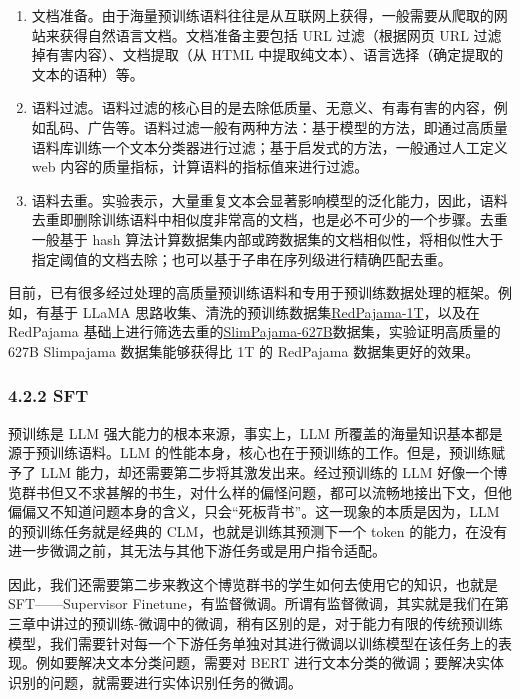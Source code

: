 \documentclass[12pt,a4paper]{book}
\begin{document}
\begin{enumerate}
\def\labelenumi{\arabic{enumi}.}
\tightlist
\item
  文档准备。由于海量预训练语料往往是从互联网上获得，一般需要从爬取的网站来获得自然语言文档。文档准备主要包括
  URL 过滤（根据网页 URL 过滤掉有害内容）、文档提取（从 HTML
  中提取纯文本）、语言选择（确定提取的文本的语种）等。
\item
  语料过滤。语料过滤的核心目的是去除低质量、无意义、有毒有害的内容，例如乱码、广告等。语料过滤一般有两种方法：基于模型的方法，即通过高质量语料库训练一个文本分类器进行过滤；基于启发式的方法，一般通过人工定义
  web 内容的质量指标，计算语料的指标值来进行过滤。
\item
  语料去重。实验表示，大量重复文本会显著影响模型的泛化能力，因此，语料去重即删除训练语料中相似度非常高的文档，也是必不可少的一个步骤。去重一般基于
  hash
  算法计算数据集内部或跨数据集的文档相似性，将相似性大于指定阈值的文档去除；也可以基于子串在序列级进行精确匹配去重。
\end{enumerate}

目前，已有很多经过处理的高质量预训练语料和专用于预训练数据处理的框架。例如，有基于
LLaMA
思路收集、清洗的预训练数据集\href{https://huggingface.co/datasets/togethercomputer/RedPajama-Data-1T}{RedPajama-1T}，以及在
RedPajama
基础上进行筛选去重的\href{https://huggingface.co/datasets/cerebras/SlimPajama-627B/tree/main/train}{SlimPajama-627B}数据集，实验证明高质量的
627B Slimpajama 数据集能够获得比 1T 的 RedPajama 数据集更好的效果。

\subsubsection{4.2.2 SFT}\label{sft}

预训练是 LLM 强大能力的根本来源，事实上，LLM
所覆盖的海量知识基本都是源于预训练语料。LLM
的性能本身，核心也在于预训练的工作。但是，预训练赋予了 LLM
能力，却还需要第二步将其激发出来。经过预训练的 LLM
好像一个博览群书但又不求甚解的书生，对什么样的偏怪问题，都可以流畅地接出下文，但他偏偏又不知道问题本身的含义，只会``死板背书''。这一现象的本质是因为，LLM
的预训练任务就是经典的 CLM，也就是训练其预测下一个 token
的能力，在没有进一步微调之前，其无法与其他下游任务或是用户指令适配。

因此，我们还需要第二步来教这个博览群书的学生如何去使用它的知识，也就是
SFT------Supervisor
Finetune，有监督微调。所谓有监督微调，其实就是我们在第三章中讲过的预训练-微调中的微调，稍有区别的是，对于能力有限的传统预训练模型，我们需要针对每一个下游任务单独对其进行微调以训练模型在该任务上的表现。例如要解决文本分类问题，需要对
BERT
进行文本分类的微调；要解决实体识别的问题，就需要进行实体识别任务的微调。
\end{document}
